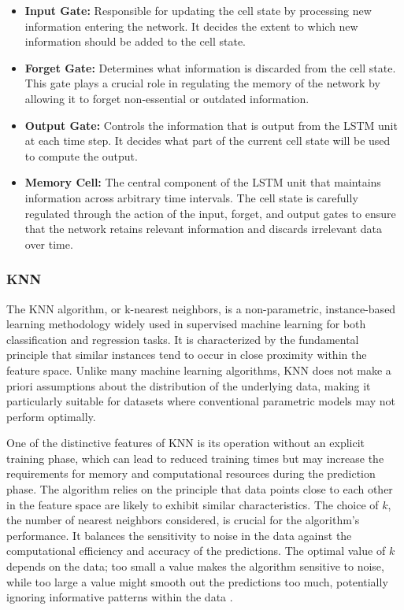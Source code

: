 \documentclass{article} %
\begin{document}
\begin{itemize}
    \item \textbf{Input Gate:} Responsible for updating the cell state by processing new information entering the network. It decides the extent to which new information should be added to the cell state.
    \item \textbf{Forget Gate:} Determines what information is discarded from the cell state. This gate plays a crucial role in regulating the memory of the network by allowing it to forget non-essential or outdated information.
    \item \textbf{Output Gate:} Controls the information that is output from the LSTM unit at each time step. It decides what part of the current cell state will be used to compute the output.
    \item \textbf{Memory Cell:} The central component of the LSTM unit that maintains information across arbitrary time intervals. The cell state is carefully regulated through the action of the input, forget, and output gates to ensure that the network retains relevant information and discards irrelevant data over time.
\end{itemize}


\subsubsection{KNN}
The \gls{KNN} algorithm, or k-nearest neighbors, is a non-parametric, instance-based learning methodology widely used in supervised machine learning for both classification and regression tasks. It is characterized by the fundamental principle that similar instances tend to occur in close proximity within the feature space. Unlike many machine learning algorithms, \gls{KNN} does not make a priori assumptions about the distribution of the underlying data, making it particularly suitable for datasets where conventional parametric models may not perform optimally.

One of the distinctive features of \gls{KNN} is its operation without an explicit training phase, which can lead to reduced training times but may increase the requirements for memory and computational resources during the prediction phase. The algorithm relies on the principle that data points close to each other in the feature space are likely to exhibit similar characteristics. The choice of \(k\), the number of nearest neighbors considered, is crucial for the algorithm's performance. It balances the sensitivity to noise in the data against the computational efficiency and accuracy of the predictions. The optimal value of \(k\) depends on the data; too small a value makes the algorithm sensitive to noise, while too large a value might smooth out the predictions too much, potentially ignoring informative patterns within the data \cite{cover1967nearest}.
\end{document}
